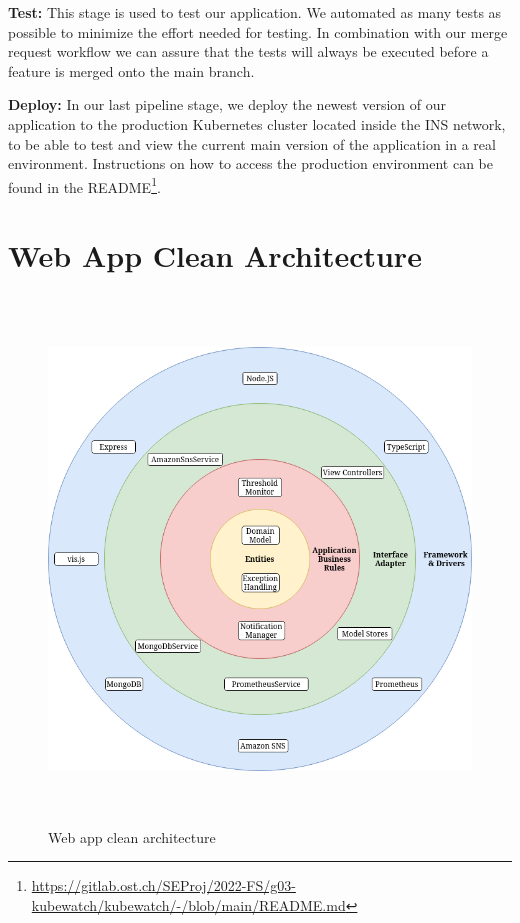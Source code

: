 \noindent
\textbf{Test:} This stage is used to test our application.
We automated as many tests as possible to minimize the effort needed for testing.
In combination with our merge request workflow we can assure that the tests will always be executed
before a feature is merged onto the main branch.

\noindent
\textbf{Deploy:} In our last pipeline stage, we deploy the newest version of our application
to the production Kubernetes cluster located inside the INS network,
to be able to test and view the current main version of the application in a real environment.
Instructions on how to access the production environment can be found in the README\footnote{\url{https://gitlab.ost.ch/SEProj/2022-FS/g03-kubewatch/kubewatch/-/blob/main/README.md}}.


\section{Web App Clean Architecture}
\begin{figure}[H]
  \centering
  \includegraphics[height=14cm]{resources/clean_architecture.drawio.png}
  \caption{Web app clean architecture}
  \label{fig:web-app-architecture}
\end{figure}


